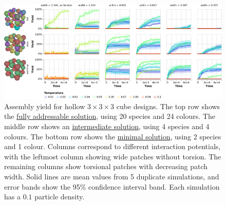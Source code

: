 \begin{figure}[ht]
    \centering
    \includegraphics[width=\linewidth]{figures/patchysim/cubePotentials.eps}
    \caption{Assembly yield for hollow \(3 \times 3 \times 3\) cube designs. The top row shows the \href{https://akodiat.github.io/polycubes/?assemblyMode=stochastic&rule=00040109020c000089110200001491010218000001018e1c002001259e000000a5290200002ca901b200000001019a30963401010200863801010200ba00013d02400000bd450200b600c5010248ae4c01010200ce00e101d20000000101ca5000000101c254de000159d600a25c010102000000d9610200}{fully addressable solution}, using 20 species and 24 colours. The middle row shows an \href{https://akodiat.github.io/polycubes/?assemblyMode=stochastic&rule=90000800000600040090000d000000008b8d000011860000}{intermediate solution}, using 4 species and 4 colours. The bottom row shows the \href{https://akodiat.github.io/polycubes/?assemblyMode=stochastic&rule=070000070500868700000000}{minimal solution}, using 2 species and 1 colour. Columns correspond to different interaction potentials, with the leftmost column showing wide patches without torsion. The remaining columns show torsional patches with decreasing patch width. Solid lines are mean values from 5 duplicate simulations, and error bands show the 95\% confidence interval band. Each simulation has a \(0.1\) particle density.}
    \label{fig:cubePotentials}
\end{figure}

